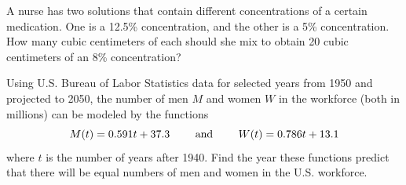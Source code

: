 \documentclass[../mathNotesPreamble]{subfiles}
\begin{document}
  \begin{ex*}
    A nurse has two solutions that contain different concentrations of a certain medication. One is a 12.5\% concentration, and the other is a 5\% concentration. How many cubic centimeters of each should she mix to obtain 20 cubic centimeters of an 8\% concentration?                
  \end{ex*}
  \pagebreak
  
  \begin{ex*}
    Using U.S. Bureau of Labor Statistics data for selected years from 1950 and projected to 2050, the number of men $M$ and women $W$ in the workforce (both in millions) can be modeled by the functions
      \[M(t)=0.591t+37.3 \hspace*{20pt}\textnormal{ and }\hspace*{20pt} W(t)=0.786t+13.1\]
    where $t$ is the number of years after 1940. Find the year these functions predict that there will be equal numbers of men and women in the U.S. workforce.
  \end{ex*}
  \begin{flushright}
  \end{flushright}
  
  \pagebreak
\end{document}
